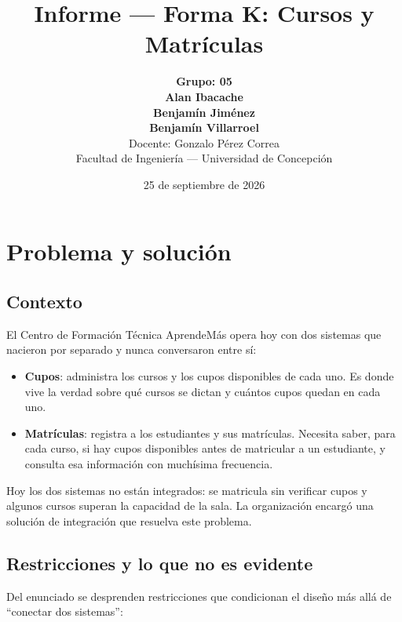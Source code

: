 \documentclass[11pt,spanish]{article}
\title{\textbf{Informe — Forma K: Cursos y Matrículas}}
\author{
    \textbf{Grupo: 05}\\[0.5em]
    \textbf{Alan Ibacache}\\[0.5em]
    \textbf{Benjamín Jiménez}\\[0.5em]
    \textbf{Benjamín Villarroel}\\[0.5em]
    \small Docente: Gonzalo Pérez Correa\\
    \small Facultad de Ingeniería — Universidad de Concepción
}
\date{25 de septiembre de 2026}
\begin{document}
\maketitle

\section{Problema y solución}

\subsection{Contexto}

El Centro de Formación Técnica AprendeMás opera hoy con dos sistemas que nacieron por separado y nunca conversaron entre sí:

\begin{itemize}
    \item \textbf{Cupos}: administra los cursos y los cupos disponibles de cada uno. Es donde vive la verdad sobre qué cursos se dictan y cuántos cupos quedan en cada uno.
    \item \textbf{Matrículas}: registra a los estudiantes y sus matrículas. Necesita saber, para cada curso, si hay cupos disponibles antes de matricular a un estudiante, y consulta esa información con muchísima frecuencia.
\end{itemize}

Hoy los dos sistemas no están integrados: se matricula sin verificar cupos y algunos cursos superan la capacidad de la sala. La organización encargó una solución de integración que resuelva este problema.

\subsection{Restricciones y lo que no es evidente}\label{sec:restricciones}

Del enunciado se desprenden restricciones que condicionan el diseño más allá de ``conectar dos sistemas'':
\end{document}
